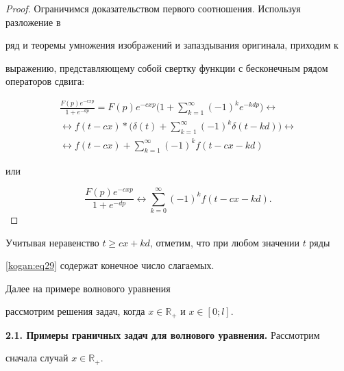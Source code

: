 \begin{proof} Ограничимся доказательством первого соотношения. Используя разложение в 

ряд и теоремы умножения изображений и запаздывания оригинала, приходим к 

выражению, представляющему собой свертку функции с бесконечным рядом операторов сдвига:

\begin{multline}

\label{kogan:eq30}

\frac{F(p)e^{-cxp}}{1+e^{-dp}}=F(p)e^{-cxp}

\biggl(1+\sum\limits_{k=1}^\infty (-1)^k e^{-kdp} \biggr)\leftrightarrow \\

\leftrightarrow f(t-cx)\ast 

\biggl( \delta (t)+\sum\limits_{k=1}^\infty (-1)^k\delta  (t-kd) \biggr)\leftrightarrow \\

\leftrightarrow f(t-cx) + \sum\limits_{k=1}^\infty (-1)^kf(t-cx-kd) 

\end{multline}

или 

\begin{equation}

\frac{F(p)e^{-cxp}}{1+e^{-dp}}\leftrightarrow \sum\limits_{k=0}^\infty 

(-1)^kf(t-cx-kd).

\end{equation}



\hfill

\end{proof}



Учитывая неравенство $t\ge cx+kd$, отметим, что при любом значении $t$ ряды 

\eqref{kogan:eq29} содержат конечное число слагаемых. 



Далее на примере волнового уравнения 

рассмотрим решения задач, когда $x\in \mathbb R_+$ и $x\in [0;l]$. 



\smallskip



{\bf 2.1. Примеры граничных задач для волнового уравнения.} Рассмотрим 

сначала случай $x\in \mathbb  R_+$. 

